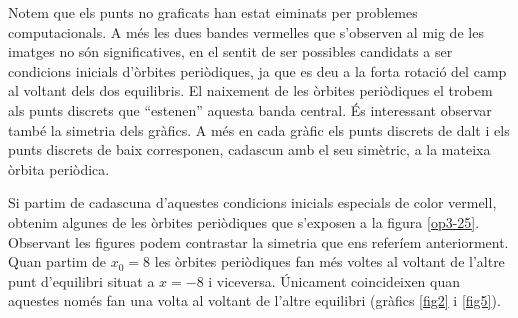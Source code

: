 \documentclass[a4paper]{article}
\theoremstyle{definition}
\begin{document}
Notem que els punts no graficats han estat e\lgem iminats per problemes computacionals. A més les dues bandes vermelles que s'observen al mig de les imatges no són significatives, en el sentit de ser possibles candidats a ser condicions inicials d'òrbites periòdiques, ja que es deu a la forta rotació del camp al voltant dels dos equilibris. El naixement de les òrbites periòdiques el trobem als punts discrets que ``estenen'' aquesta banda central. És interessant observar també la simetria dels gràfics. A més en cada gràfic els punts discrets de dalt i els punts discrets de baix corresponen, cadascun amb el seu simètric, a la mateixa òrbita periòdica.

Si partim de cadascuna d'aquestes condicions inicials especials de color vermell, obtenim algunes de les òrbites periòdiques que s'exposen a la figura \ref{op3-25}. Observant les figures podem contrastar la simetria que ens referíem anteriorment. Quan partim de $x_0=8$ les òrbites periòdiques fan més voltes al voltant de l'altre punt d'equilibri situat a $x=-8$ i viceversa. Únicament coincideixen quan aquestes només fan una volta al voltant de l'altre equilibri (gràfics \ref{fig2} i \ref{fig5}).

\end{document}
